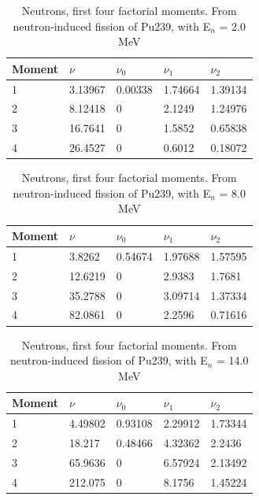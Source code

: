 \documentclass[]{article}
\begin{document}
\begin{table} [H]
	\centering
	\caption{Neutrons, first four factorial moments. From neutron-induced fission of Pu239, with E$_n$ = 2.0 MeV }
	\begin{tabularx}{\textwidth}{XXXXX} \hline
		\label{Pu239_n_moments_2}
		Moment & $\nu$ & $\nu_0$ & $\nu_1$ & $\nu_2$ \\ \hline
		1 & 3.13967 & 0.00338 & 1.74664 & 1.39134\\
		2 & 8.12418 & 0 & 2.1249 & 1.24976\\
		3 & 16.7641 & 0 & 1.5852 & 0.65838\\
		4 & 26.4527 & 0 & 0.6012 & 0.18072\\ 
	\end{tabularx}
\end{table}

\begin{table} [H]
	\centering
	\caption{Neutrons, first four factorial moments. From neutron-induced fission of Pu239, with E$_n$ = 8.0 MeV }
	\begin{tabularx}{\textwidth}{XXXXX} \hline
		\label{Pu239_n_moments_8}
		Moment & $\nu$ & $\nu_0$ & $\nu_1$ & $\nu_2$ \\ \hline
		1 & 3.8262 & 0.54674 & 1.97688 & 1.57595\\
		2 & 12.6219 & 0 & 2.9383 & 1.7681\\
		3 & 35.2788 & 0 & 3.09714 & 1.37334\\
		4 & 82.0861 & 0 & 2.2596 & 0.71616\\ 
	\end{tabularx}
\end{table}

\begin{table} [H]
	\centering
	\caption{Neutrons, first four factorial moments. From neutron-induced fission of Pu239, with E$_n$ = 14.0 MeV }
	\begin{tabularx}{\textwidth}{XXXXX} \hline
		\label{Pu239_n_moments_14}
		Moment & $\nu$ & $\nu_0$ & $\nu_1$ & $\nu_2$ \\ \hline
		1 & 4.49802 & 0.93108 & 2.29912 & 1.73344\\
		2 & 18.217 & 0.48466 & 4.32362 & 2.2436\\
		3 & 65.9636 & 0 & 6.57924 & 2.13492\\
		4 & 212.075 & 0 & 8.1756 & 1.45224\\ 
	\end{tabularx}
\end{table}
\end{document}
